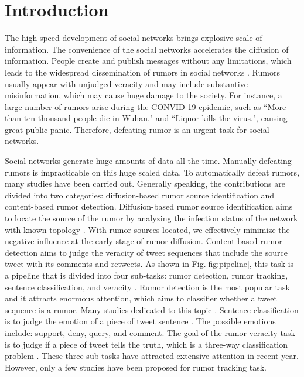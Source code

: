 \section{Introduction}
\label{sec:introduction}
The high-speed development of social networks brings explosive scale of information. The convenience of the social networks accelerates the diffusion of information. People create and publish messages without any limitations, which leads to the widespread dissemination of rumors in social networks \cite{DBLP:journals/corr/KurkaGZ15, DBLP:journals/csur/ZubiagaABLP18, DBLP:conf/sirocco/KostkaOW08, vosoughi2018spread}. Rumors usually appear with unjudged veracity and may include substantive misinformation, which may cause huge damage to the society. For instance, a large number of rumors arise during the CONVID-19 epidemic, such as ``More than ten thousand people die in Wuhan." and ``Liquor kills the virus.", causing great public panic. Therefore, defeating rumor is an urgent task for social networks.

Social networks generate huge amounts of data all the time. Manually defeating rumors is impracticable on this huge scaled data. To automatically defeat rumors, many studies have been carried out. Generally speaking, the contributions are divided into two categories:  diffusion-based rumor source identification and content-based rumor detection. Diffusion-based rumor source identification aims to locate the source of the rumor by analyzing the infection status of the network with known topology \cite{DBLP:conf/sigmetrics/ShahZ10, DBLP:journals/tit/ShahZ11, DBLP:conf/kdd/LappasTGM10}. With rumor sources located, we effectively minimize the negative influence at the early stage of rumor diffusion. Content-based rumor detection aims to judge the veracity of tweet sequences that include the source tweet with its comments and retweets. As shown in Fig.\ref{fig:pipeline}, this task is a pipeline that is divided into four sub-tasks: rumor detection, rumor tracking, sentence classification, and veracity \cite{DBLP:journals/csur/ZubiagaABLP18, DBLP:conf/coling/KochkinaLZ18}. Rumor detection is the most popular task and it attracts enormous attention, which aims to classifier whether a tweet sequence is a rumor. Many studies dedicated to this topic \cite{DBLP:conf/socinfo/ZubiagaLP17, DBLP:conf/www/Ma0W19,DBLP:conf/naacl/NguyenDCD19, DBLP:journals/corr/abs-1906-05659}. Sentence classification is to judge the emotion of a piece of tweet sentence \cite{DBLP:conf/semeval/EnayetE17, DBLP:conf/semeval/X17a, DBLP:conf/coling/ZubiagaKLPL16}. The possible emotions include: support, deny, query, and comment. The goal of the rumor veracity task is to judge if a piece of tweet tells the truth, which is a three-way classification problem \cite{DBLP:conf/coling/KochkinaLZ18, DBLP:conf/acl/LiZS19, DBLP:conf/acl/KumarC19}. These three sub-tasks have attracted extensive attention in recent year. However, only a few studies have been proposed for rumor tracking task.

